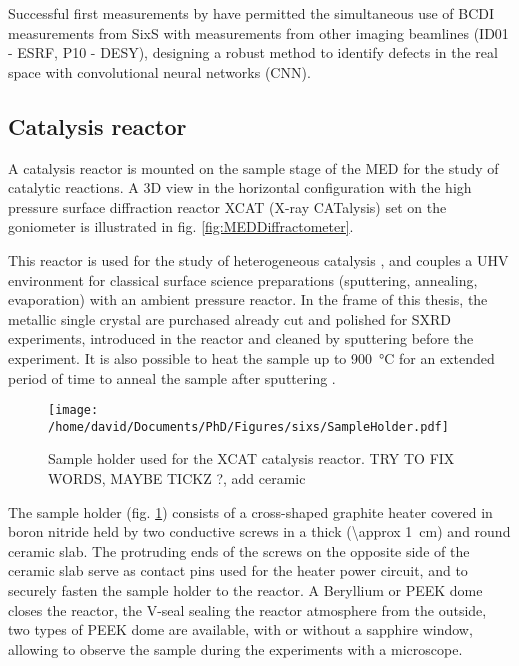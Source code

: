 Successful first measurements by \cite{Lim2021} have permitted the simultaneous use of BCDI measurements from SixS with measurements from other imaging beamlines (ID01 - ESRF, P10 - DESY), designing a robust method to identify defects in the real space with convolutional neural networks (CNN).

\subsection{Catalysis reactor}\label{sec:XCAT}

A catalysis reactor is mounted on the sample stage of the MED for the study of catalytic reactions.
A 3D view in the horizontal configuration with the high pressure surface diffraction reactor XCAT (X-ray CATalysis) set on the goniometer is illustrated in fig. \ref{fig:MEDDiffractometer}.

This reactor is used for the study of heterogeneous catalysis \parencite{VanRijn2010, Resta2020a}, and couples a UHV environment for classical surface science preparations (sputtering, annealing, evaporation) with an ambient pressure reactor.
In the frame of this thesis, the metallic single crystal are purchased already cut and polished for SXRD experiments, introduced in the reactor and cleaned by sputtering \parencite{Taglauer1990} before the experiment.
It is also possible to heat the sample up to \qty{900}{\degreeCelsius} for an extended period of time to anneal the sample after sputtering \parencite{Musket1982}.

\begin{figure}[!htb]
    \centering
    \texttt{[image: /home/david/Documents/PhD/Figures/sixs/SampleHolder.pdf]}
    \caption{
        Sample holder used for the XCAT catalysis reactor.
        \textcolor{Important}{TRY TO FIX WORDS, MAYBE TICKZ ?, add ceramic}
    }
    \label{fig:SampleHolder}
\end{figure}

The sample holder (fig. \ref{fig:SampleHolder}) consists of a cross-shaped graphite heater covered in boron nitride held by two conductive screws in a thick (\qty{\approx 1}{\cm}) and round ceramic slab.
The protruding ends of the screws on the opposite side of the ceramic slab serve as contact pins used for the heater power circuit, and to securely fasten the sample holder to the reactor.
A Beryllium or PEEK dome closes the reactor, the V-seal sealing the reactor atmosphere from the outside, two types of PEEK dome are available, with or without a sapphire window, allowing to observe the sample during the experiments with a microscope.

